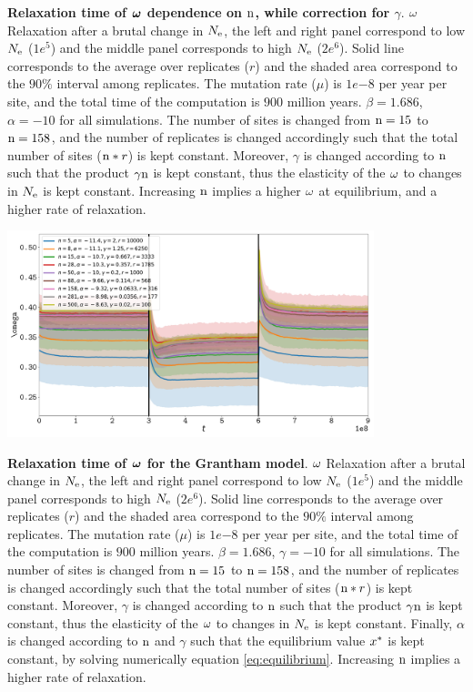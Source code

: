\documentclass{article}
\begin{document}
\textbf{Relaxation time of $\bm{\omega}$ dependence on $\text{n}$, while correction for $\gamma$}.
$\omega$ Relaxation after a brutal change in $N_{\mathrm{e}}$, the left and right panel correspond to low $N_{\mathrm{e}}$ ($1e^{5}$) and the middle panel corresponds to high $N_{\mathrm{e}}$ ($2e^{6}$). 
Solid line corresponds to the average over replicates ($r$) and the shaded area correspond to the $90\%$ interval among replicates. 
The mutation rate ($\mu$) is $1e{-8}$ per year per site, and the total time of the computation is $900$ million years.
$\beta=1.686$, $\alpha=-10$ for all simulations. The number of sites is changed from $\text{n}=15$ to $\text{n}=158$, and the number of replicates is changed accordingly such that the total number of sites ($\text{n}*r$) is kept constant.
Moreover, $\gamma$ is changed according to $\text{n}$ such that the product $\gamma\text{n}$ is kept constant, thus the  elasticity of the $\omega$ to changes in $N_{\mathrm{e}}$ is kept constant.
Increasing $\text{n}$ implies a higher $\omega$ at equilibrium, and a higher rate of relaxation.
\begin{center}
 \includegraphics[width=0.8\textwidth] {artworks/Relaxation-Stability-Grantham-Alpha-Gamma.pdf}
\end{center}
\textbf{Relaxation time of $\bm{\omega}$ for the Grantham model}.
$\omega$ Relaxation after a brutal change in $N_{\mathrm{e}}$, the left and right panel correspond to low $N_{\mathrm{e}}$ ($1e^{5}$) and the middle panel corresponds to high $N_{\mathrm{e}}$ ($2e^{6}$). 
Solid line corresponds to the average over replicates ($r$) and the shaded area correspond to the $90\%$ interval among replicates. 
The mutation rate ($\mu$) is $1e{-8}$ per year per site, and the total time of the computation is $900$ million years.
$\beta=1.686$, $\gamma=-10$ for all simulations. The number of sites is changed from $\text{n}=15$ to $\text{n}=158$, and the number of replicates is changed accordingly such that the total number of sites ($\text{n}*r$) is kept constant.
Moreover, $\gamma$ is changed according to $\text{n}$ such that the product $\gamma\text{n}$ is kept constant, thus the  elasticity of the $\omega$ to changes in $N_{\mathrm{e}}$ is kept constant.
Finally, $\alpha$ is changed according to $\text{n}$ and $\gamma$ such that the equilibrium value $x^{*}$ is kept constant, by solving numerically equation \ref{eq:equilibrium}.
Increasing $\text{n}$ implies a higher rate of relaxation.



\end{document}
